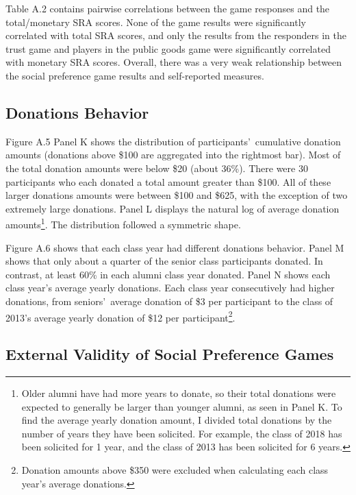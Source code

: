 \documentclass[12pt]{article}
\begin{document}
Table A.2 contains pairwise correlations between the game responses and the total/monetary SRA scores. None of the game results were significantly correlated with total SRA scores, and only the results from the responders in the trust game and players in the public goods game were significantly correlated with monetary SRA scores. Overall, there was a very weak relationship between the social preference game results and self-reported measures. 

\subsection{Donations Behavior}

Figure A.5 Panel K shows the distribution of participants\rq \ cumulative donation amounts (donations above \$100 are aggregated into the rightmost bar). Most of the total donation amounts were below \$20 (about 36\%). There were 30 participants who each donated a total amount greater than \$100. All of these larger donations amounts were between \$100 and \$625, with the exception of two extremely large donations. Panel L displays the natural log of average donation amounts\footnote{Older alumni have had more years to donate, so their total donations were expected to generally be larger than younger alumni, as seen in Panel K. To find the average yearly donation amount, I divided total donations by the number of years they have been solicited. For example, the class of 2018 has been solicited for 1 year, and the class of 2013 has been solicited for 6 years.}. The distribution followed a symmetric shape.

Figure A.6 shows that each class year had different donations behavior. Panel M shows that only about a quarter of the senior class participants donated. In contrast, at least 60\% in each alumni class year donated. Panel N shows each class year\rq s average yearly donations. Each class year consecutively had higher donations, from seniors\rq \ average donation of \$3 per participant to the class of 2013\rq s average yearly donation of \$12 per participant\footnote{Donation amounts above \$350 were excluded when calculating each class year\rq s average donations.}.


\subsection{External Validity of Social Preference Games}
\end{document}
